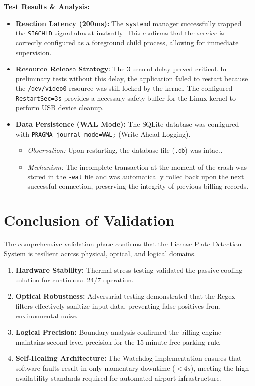\textbf{Test Results \& Analysis:}
\begin{itemize}
	\item \textbf{Reaction Latency (200ms):} The \texttt{systemd} manager successfully trapped the \texttt{SIGCHLD} signal almost instantly. This confirms that the service is correctly configured as a foreground child process, allowing for immediate supervision.
	\item \textbf{Resource Release Strategy:} The 3-second delay proved critical. In preliminary tests without this delay, the application failed to restart because the \texttt{/dev/video0} resource was still locked by the kernel. The configured \texttt{RestartSec=3s} provides a necessary safety buffer for the Linux kernel to perform USB device cleanup.
	\item \textbf{Data Persistence (WAL Mode):} 
	The SQLite database was configured with \texttt{PRAGMA journal\_mode=WAL;} (Write-Ahead Logging). 
	\begin{itemize}
		\item \textit{Observation:} Upon restarting, the database file (\texttt{.db}) was intact.
		\item \textit{Mechanism:} The incomplete transaction at the moment of the crash was stored in the \texttt{-wal} file and was automatically rolled back upon the next successful connection, preserving the integrity of previous billing records.
	\end{itemize}
\end{itemize}

\section{Conclusion of Validation}
The comprehensive validation phase confirms that the License Plate Detection System is resilient across physical, optical, and logical domains. 

\begin{enumerate}
	\item \textbf{Hardware Stability:} Thermal stress testing validated the passive cooling solution for continuous 24/7 operation.
	\item \textbf{Optical Robustness:} Adversarial testing demonstrated that the Regex filters effectively sanitize input data, preventing false positives from environmental noise.
	\item \textbf{Logical Precision:} Boundary analysis confirmed the billing engine maintains second-level precision for the 15-minute free parking rule.
	\item \textbf{Self-Healing Architecture:} The Watchdog implementation ensures that software faults result in only momentary downtime ($<4s$), meeting the high-availability standards required for automated airport infrastructure.
\end{enumerate}